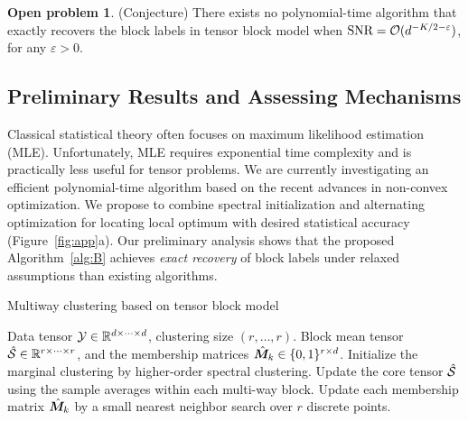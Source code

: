 \documentclass[11pt]{article}
\DeclareRobustCommand{\mybox}[2][gray!20]{%
\begin{tcolorbox}[   %
        breakable,
        left=0pt,
        right=0pt,
        top=0pt,
        bottom=0pt,
        colback=#1,
        colframe=#1,
        width=\dimexpr\textwidth\relax, 
        enlarge left by=0mm,
        boxsep=5pt,
        arc=0pt,outer arc=0pt,
        ]
        #2
\end{tcolorbox}}
\DeclareRobustCommand{\mybox}[2][gray!20]{%
\begin{tcolorbox}[   %
        breakable,
        left=0pt,
        right=0pt,
        top=0pt,
        bottom=0pt,
        colback=#1,
        colframe=#1,
        width=\dimexpr\textwidth\relax, 
        enlarge left by=0mm,
        boxsep=5pt,
        arc=0pt,outer arc=0pt,
        ]
        #2
\end{tcolorbox}
}
\theoremstyle{exampstyle}
\theoremstyle{definition}
\newtheorem{open}[]{Open problem}
\begin{document}
\mybox[gray!20]{
\begin{open}(Conjecture) There exists no polynomial-time algorithm that exactly recovers the block labels in tensor block model when $\text{SNR}=\mathcal{O}(d^{-K/2-\varepsilon})$, for any $\varepsilon >0$.
\end{open}
}

\vspace{-.3cm}
\subsection{Preliminary Results and Assessing Mechanisms}
\vspace{-.3cm}
Classical statistical theory often focuses on maximum likelihood estimation (MLE). Unfortunately, MLE requires exponential time complexity and is practically less useful for tensor problems. We are currently investigating an efficient polynomial-time algorithm based on the recent advances in non-convex optimization. We propose to combine spectral initialization and alternating optimization for locating local optimum with desired statistical accuracy (Figure~\ref{fig:app}a). Our preliminary analysis shows that the proposed Algorithm~\ref{alg:B} achieves \emph{exact recovery} of block labels under relaxed assumptions than existing algorithms. 


\begin{algorithm}[http]
\caption{Multiway clustering based on tensor block model}\label{alg:B}
\begin{algorithmic}[1]
\INPUT Data tensor $\mathcal{Y}\in \mathbb{R}^{d\times \cdots \times d}$, clustering size $(r,\ldots,r)$.
\OUTPUT Block mean tensor $\hat {\mathcal{S}}\in\mathbb{R}^{r\times \cdots\times r}$, and the membership matrices $\hat {\bm M}_k\in\{0,1\}^{r\times d}$. 
\State Initialize the marginal clustering by higher-order spectral clustering. 
\State Update the core tensor $\hat {\mathcal{S}}$ using the sample averages within each multi-way block. 
\State Update each membership matrix $\hat {\bm M}_k$ by a small nearest neighbor search over $r$ discrete points. 
\EndFor
\end{algorithmic}
\end{algorithm}
\end{document}
